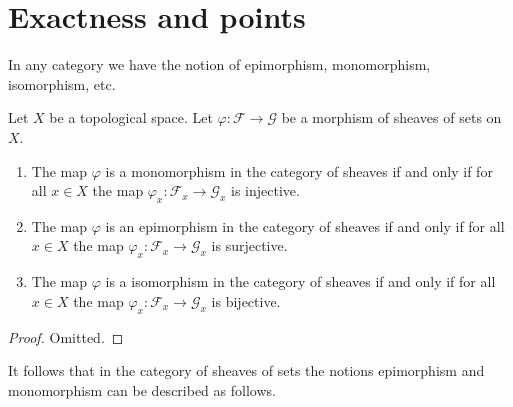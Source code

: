 \section{Exactness and points}
\label{section-exactness-points}

\noindent
In any category we have the notion of epimorphism, monomorphism,
isomorphism, etc.

\begin{lemma}
\label{lemma-points-exactness}
Let $X$ be a topological space. Let $\varphi : \mathcal{F} \to \mathcal{G}$
be a morphism of sheaves of sets on $X$.
\begin{enumerate}
\item The map $\varphi$ is a monomorphism in the category of sheaves
if and only if for all $x \in X$ the map
$\varphi_x : \mathcal{F}_x \to \mathcal{G}_x$
is injective.
\item The map $\varphi$ is an epimorphism in the category of sheaves
if and only if for all $x \in X$ the map
$\varphi_x : \mathcal{F}_x \to \mathcal{G}_x$
is surjective.
\item The map $\varphi$ is a isomorphism in the category of sheaves
if and only if for all $x \in X$ the map
$\varphi_x : \mathcal{F}_x \to \mathcal{G}_x$
is bijective.
\end{enumerate}
\end{lemma}

\begin{proof}
Omitted.
\end{proof}

\noindent
It follows that in the category of sheaves of sets
the notions epimorphism and monomorphism can be described
as follows.

